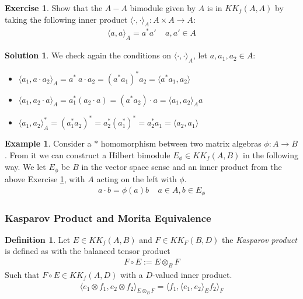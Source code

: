 \documentclass[a4paper]{article}
\theoremstyle{definition}
\newtheorem{definition}{Definition}
\theoremstyle{definition}
\theoremstyle{definition}
\newtheorem{example}{Example}
\theoremstyle{theorem}
\theoremstyle{theorem}
\newtheorem{exercise}{Exercise}
\theoremstyle{theorem}
\theoremstyle{definition}
\newtheorem{solution}{Solution}
\begin{document}
\begin{exercise}
    Show that the $A-A$ bimodule given by $A$ is in $KK_f(A,A)$ by taking the following inner product
    $\langle \cdot,\cdot\rangle_A:A \times A \rightarrow A$:
    \begin{align*}
        \langle a, a\rangle_A = a^*a' \;\;\;\; a,a'\in A
    \end{align*}
    \label{exercise: inner-product}
\end{exercise}
\begin{solution}
    We check again the conditions on $\langle \cdot, \cdot\rangle _A$, let $a, a_1, a_2 \in A$:
    \begin{itemize}
        \item $\langle a_1, a\cdot a_2\rangle _A = a^*\ a\cdot a_2 = (a^*a_1)^* a_2 = \langle  a^*a_1, a_2\rangle  $
        \item $\langle a_1, a_2 \cdot a\rangle _A = a^*_1 (a_2\cdot a) = (a^*a_2)\cdot a = \langle a_1, a_2\rangle _A a$
        \item $\langle a_1, a_2\rangle _A^* = (a_1^* a_2)^* = a_2^*(a_1^*)^* = a_2^* a_1 = \langle a_2, a_1\rangle $
    \end{itemize}
\end{solution}

\begin{example}
    Consider a $*$ homomorphism between two matrix algebras $\phi:A\rightarrow B$.
    From it we can construct a Hilbert bimodule $E_{\phi} \in KK_f(A, B)$ in the following way.
    We let $E_{\phi}$ be $B$ in the vector space sense and an inner product from the above
    Exercise \ref{exercise: inner-product}, with $A$ acting on the left with $\phi$.
    \begin{align*}
        a\cdot b = \phi(a)b \;\;\;\; a\in A, b\in E_{\phi}
    \end{align*}
\end{example}



\subsubsection{Kasparov Product and Morita Equivalence}
\begin{definition}
    Let $E \in KK_f(A, B)$ and $F \in KK_F(B, D)$ the \textit{Kasparov product} is defined as
    with the balanced tensor product
    \begin{align*}
        F \circ E := E \otimes _B F
    \end{align*}
    Such that $F\circ E \in KK_f(A,D)$ with a $D$-valued inner product.
    \begin{align*}
        \langle e_1 \otimes f_1, e_2 \otimes f_2\rangle _{E\otimes _B F} = \langle f_1,\langle e_1, e_2\rangle _E f_2\rangle _F
    \end{align*}
\end{definition}
\end{document}
